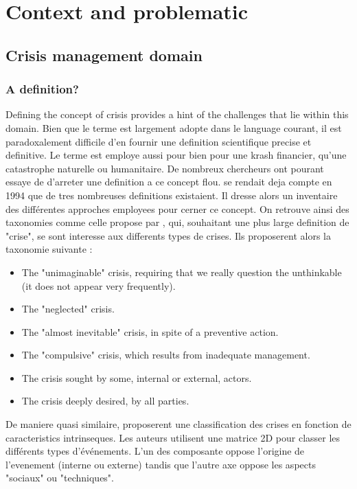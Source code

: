 \chapter{Context and problematic}

\section{Crisis management domain}
\subsection{A definition?}
Defining the concept of crisis provides a hint of the challenges that lie within this domain.
Bien que le terme est largement adopte dans le language courant, il est paradoxalement difficile d'en fournir une definition scientifique precise et definitive.
Le terme est employe aussi pour bien pour une krash financier, qu'une catastrophe naturelle ou humanitaire.
De nombreux chercheurs ont pourant essaye de d'arreter une definition a ce concept flou.
\cite{lagadecGESTIONCRISES1994} se rendait deja compte en 1994 que de tres nombreuses definitions existaient.
Il dresse alors un inventaire des différentes approches employees pour cerner ce concept.
On retrouve ainsi des taxonomies comme celle propose par \cite{rosenthalCrisisDecisionMakingNetherlands1986}, qui, souhaitant une plus large definition
de "crise", se sont interesse aux differents types de crises. Ils proposerent alors la taxonomie suivante :
\begin{itemize}
    \item The "unimaginable" crisis, requiring that we really question the unthinkable (it does not appear very frequently).
    \item The "neglected" crisis.
    \item The "almost inevitable" crisis, in spite of a preventive action.
    \item The "compulsive" crisis, which results from inadequate management.
    \item The crisis sought by some, internal or external, actors.
    \item The crisis deeply desired, by all parties.
\end{itemize}
De maniere quasi similaire, \cite{mitroffStructureManmadeOrganizational1988} proposerent une classification des crises en fonction de caracteristics intrinseques.
Les auteurs utilisent une matrice 2D pour classer les différents types d'événements.
L'un des composante oppose l'origine de l'evenement (interne ou externe) tandis que l'autre axe oppose les aspects "sociaux" ou "techniques".
